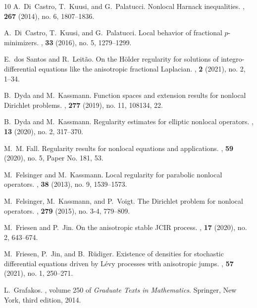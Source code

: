\documentclass[11pt]{amsart}
\theoremstyle{plain}
\theoremstyle{definition}
\numberwithin{equation}{section}
\begin{document}
\begin{thebibliography}{10}
A.~Di~Castro, T.~Kuusi, and G.~Palatucci.
\newblock Nonlocal {H}arnack inequalities.
, \textbf{267} (2014), no. 6, 1807--1836.

A.~Di~Castro, T.~Kuusi, and G.~Palatucci.
\newblock Local behavior of fractional {$p$}-minimizers.
,
  \textbf{33} (2016), no. 5, 1279--1299.

E.~dos Santos and R.~Leit{\~a}o.
\newblock On the {H}{\"o}lder regularity for solutions of integro-differential
  equations like the anisotropic fractional {L}aplacian.
, \textbf{2} (2021), no. 2, 1--34.

B.~Dyda and M.~Kassmann.
\newblock Function spaces and extension results for nonlocal {D}irichlet
  problems.
, \textbf{277} (2019), no. 11, 108134, 22.

B.~Dyda and M.~Kassmann.
\newblock Regularity estimates for elliptic nonlocal operators.
, \textbf{13} (2020), no. 2, 317--370.

M.~M. Fall.
\newblock Regularity results for nonlocal equations and applications.
, \textbf{59} (2020), no. 5, Paper No. 181,
  53.

M.~Felsinger and M.~Kassmann.
\newblock Local regularity for parabolic nonlocal operators.
, \textbf{38} (2013), no. 9, 1539--1573.

M.~Felsinger, M.~Kassmann, and P.~Voigt.
\newblock The {D}irichlet problem for nonlocal operators.
, \textbf{279} (2015), no. 3-4, 779--809.

M.~Friesen and P.~Jin.
\newblock On the anisotropic stable {JCIR} process.
, \textbf{17} (2020), no. 2, 643--674.

M.~Friesen, P.~Jin, and B.~R\"{u}diger.
\newblock Existence of densities for stochastic differential equations driven
  by {L}\'{e}vy processes with anisotropic jumps.
, \textbf{57} (2021), no. 1, 250--271.

L.~Grafakos.
, volume 250 of {\em Graduate Texts in
  Mathematics}.
\newblock Springer, New York, third edition, 2014.


\end{thebibliography}
\end{document}
